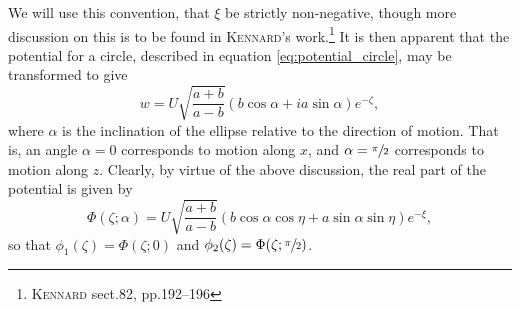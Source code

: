 We will use this convention, that $\xi$ be strictly non-negative, though more discussion on this is to be found in \textsc{Kennard}'s work.\footnote{\cite{kennard1967irrotational} \textsc{Kennard} sect.82, pp.192--196}
It is then apparent that the potential for a circle, described in equation \eqref{eq:potential_circle}, may be transformed to give
\begin{equation}\label{eq:potential_ellipse}
w = U\sqrt{\frac{a + b}{a - b}} (b \cos{\alpha} + i a \sin{\alpha}) e^{-\zeta},
\end{equation}
where $\alpha$ is the inclination of the ellipse relative to the direction of motion.
That is, an angle $\alpha = 0$ corresponds to motion along $x$, and $\alpha = \sfrac{\pi}{2}$ corresponds to motion along $z$.
Clearly, by virtue of the above discussion, the real part of the potential is given by
\[
\Phi(\zeta; \alpha) = U \sqrt{\frac{a + b}{a - b}} (b\cos{\alpha} \cos{\eta} + a \sin{\alpha} \sin{\eta}) e^{-\xi},
\]
so that $\phi_1 (\zeta) = \Phi(\zeta; 0)$ and $\phi_2 (\zeta) = \Phi(\zeta; \sfrac{\pi}{2})$.
